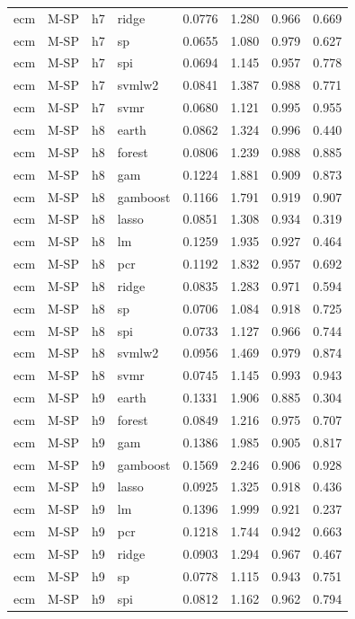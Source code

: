 \begin{ThreePartTable}
\begin{longtable}[t]{llclcccc}
ecm & M-SP & h7 & ridge & 0.0776 & 1.280 & 0.966 & 0.669\\
ecm & M-SP & h7 & sp & 0.0655 & 1.080 & 0.979 & 0.627\\
ecm & M-SP & h7 & spi & 0.0694 & 1.145 & 0.957 & 0.778\\
ecm & M-SP & h7 & svmlw2 & 0.0841 & 1.387 & 0.988 & 0.771\\
ecm & M-SP & h7 & svmr & 0.0680 & 1.121 & 0.995 & 0.955\\
\addlinespace
ecm & M-SP & h8 & earth & 0.0862 & 1.324 & 0.996 & 0.440\\
ecm & M-SP & h8 & forest & 0.0806 & 1.239 & 0.988 & 0.885\\
ecm & M-SP & h8 & gam & 0.1224 & 1.881 & 0.909 & 0.873\\
ecm & M-SP & h8 & gamboost & 0.1166 & 1.791 & 0.919 & 0.907\\
ecm & M-SP & h8 & lasso & 0.0851 & 1.308 & 0.934 & 0.319\\
ecm & M-SP & h8 & lm & 0.1259 & 1.935 & 0.927 & 0.464\\
ecm & M-SP & h8 & pcr & 0.1192 & 1.832 & 0.957 & 0.692\\
ecm & M-SP & h8 & ridge & 0.0835 & 1.283 & 0.971 & 0.594\\
ecm & M-SP & h8 & sp & 0.0706 & 1.084 & 0.918 & 0.725\\
ecm & M-SP & h8 & spi & 0.0733 & 1.127 & 0.966 & 0.744\\
ecm & M-SP & h8 & svmlw2 & 0.0956 & 1.469 & 0.979 & 0.874\\
ecm & M-SP & h8 & svmr & 0.0745 & 1.145 & 0.993 & 0.943\\
\addlinespace
ecm & M-SP & h9 & earth & 0.1331 & 1.906 & 0.885 & 0.304\\
ecm & M-SP & h9 & forest & 0.0849 & 1.216 & 0.975 & 0.707\\
ecm & M-SP & h9 & gam & 0.1386 & 1.985 & 0.905 & 0.817\\
ecm & M-SP & h9 & gamboost & 0.1569 & 2.246 & 0.906 & 0.928\\
ecm & M-SP & h9 & lasso & 0.0925 & 1.325 & 0.918 & 0.436\\
ecm & M-SP & h9 & lm & 0.1396 & 1.999 & 0.921 & 0.237\\
ecm & M-SP & h9 & pcr & 0.1218 & 1.744 & 0.942 & 0.663\\
ecm & M-SP & h9 & ridge & 0.0903 & 1.294 & 0.967 & 0.467\\
ecm & M-SP & h9 & sp & 0.0778 & 1.115 & 0.943 & 0.751\\
ecm & M-SP & h9 & spi & 0.0812 & 1.162 & 0.962 & 0.794\\

\end{longtable}
\end{ThreePartTable}
